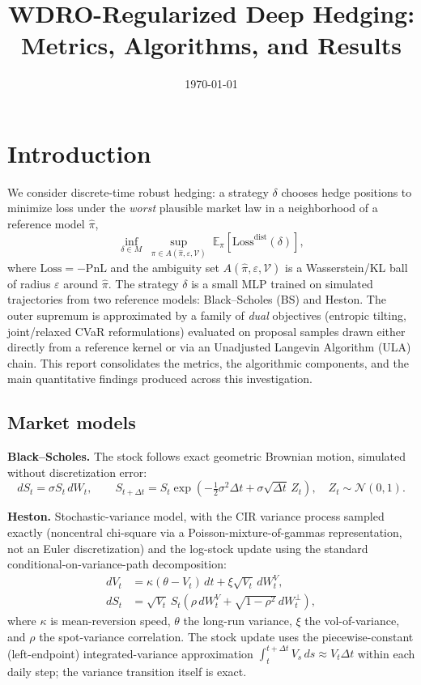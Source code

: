 \documentclass[11pt]{article}
\title{WDRO-Regularized Deep Hedging: Metrics, Algorithms, and Results}
\author{}
\date{\today}
\begin{document}
\maketitle
\tableofcontents

\section{Introduction}

We consider discrete-time robust hedging: a strategy $\delta$ chooses hedge positions to
minimize loss under the \emph{worst} plausible market law in a neighborhood of a reference model
$\hat\pi$,
\begin{equation}\label{eq:problem}
  \inf_{\delta \in M} \; \sup_{\pi \in A(\hat\pi, \varepsilon, \mathcal{V})} \;
  \mathbb{E}_{\pi}\left[\mathrm{Loss}^{\mathrm{dist}}(\delta)\right],
\end{equation}
where $\mathrm{Loss} = -\mathrm{PnL}$ and the ambiguity set $A(\hat\pi,\varepsilon,\mathcal{V})$
is a Wasserstein/KL ball of radius $\varepsilon$ around $\hat\pi$. The strategy $\delta$ is a
small MLP trained on simulated trajectories from two reference models: Black--Scholes (BS) and
Heston. The outer supremum is approximated by a family of \emph{dual} objectives (entropic
tilting, joint/relaxed CVaR reformulations) evaluated on proposal samples drawn either directly
from a reference kernel or via an Unadjusted Langevin Algorithm (ULA) chain. This report
consolidates the metrics, the algorithmic components, and the main quantitative findings
produced across this investigation.

\subsection{Market models}

\textbf{Black--Scholes.} The stock follows exact geometric Brownian motion, simulated
without discretization error:
\begin{equation}\label{eq:bs-sde}
  dS_t = \sigma S_t \, dW_t, \qquad
  S_{t+\Delta t} = S_t \exp\!\left(-\tfrac{1}{2}\sigma^2 \Delta t + \sigma\sqrt{\Delta t}\,Z_t\right),
  \quad Z_t \sim \mathcal N(0,1).
\end{equation}

\textbf{Heston.} Stochastic-variance model, with the CIR variance process sampled exactly
(noncentral chi-square via a Poisson-mixture-of-gammas representation, not an Euler
discretization) and the log-stock update using the standard conditional-on-variance-path
decomposition:
\begin{align}
  dV_t &= \kappa(\theta - V_t)\,dt + \xi \sqrt{V_t}\, dW^V_t, \label{eq:heston-var}\\
  dS_t &= \sqrt{V_t}\, S_t \left(\rho\, dW^V_t + \sqrt{1-\rho^2}\, dW^\perp_t\right), \label{eq:heston-stock}
\end{align}
where $\kappa$ is mean-reversion speed, $\theta$ the long-run variance, $\xi$ the
vol-of-variance, and $\rho$ the spot-variance correlation. The stock update uses the
piecewise-constant (left-endpoint) integrated-variance approximation
$\int_t^{t+\Delta t} V_s\,ds \approx V_t \Delta t$ within each daily step; the variance
transition itself is exact.
\end{document}

